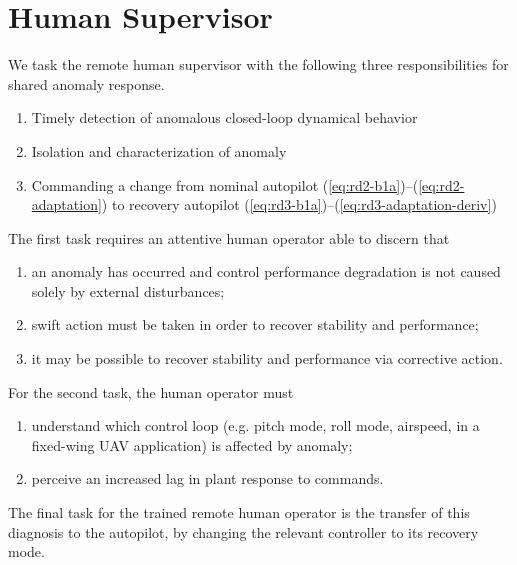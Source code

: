 \section{Human Supervisor}\label{subsec:sc_human}
We task the remote human supervisor with the following three responsibilities for shared anomaly response.
\begin{enumerate}[label=Task \arabic*., leftmargin=1.8cm]
	\item Timely detection of anomalous closed-loop dynamical behavior
	\item Isolation and characterization of anomaly
	\item Commanding a change from nominal autopilot (\ref{eq:rd2-b1a})--(\ref{eq:rd2-adaptation}) to recovery autopilot (\ref{eq:rd3-b1a})--(\ref{eq:rd3-adaptation-deriv})
\end{enumerate}
The first task requires an attentive human operator able to discern that 
\begin{enumerate}[label=(\alph*)]
	\item an anomaly has occurred and control performance degradation is not caused solely by external disturbances;
	\item swift action must be taken in order to recover stability and performance;
	\item it may be possible to recover stability and performance via corrective action.
\end{enumerate}	
For the second task, the human operator must
\begin{enumerate}[label=(\alph*)]
	\item understand which control loop (e.g. pitch mode, roll mode, airspeed, in a fixed-wing UAV application) is affected by anomaly;
	\item perceive an increased lag in plant response to commands.
\end{enumerate}
The final task for the trained remote human operator is the transfer of this diagnosis to the autopilot, by changing the relevant controller to its recovery mode.


